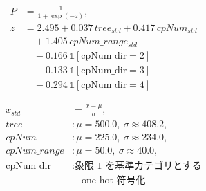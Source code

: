 \begin{equation}
\label{eq:logistic_multi_scaled_prospect}
\begin{aligned}
  P &= \frac{1}{1 + \exp(-z)}, \\
  z &= 2.495 + 0.037\, tree_{std} + 0.417\, cpNum_{std} \\
    &\quad + 1.405\, cpNum\_range_{std} \\
    &\quad - 0.166\, \mathbb{1}[\mathrm{cpNum\_dir}{=}2] \\
    &\quad - 0.133\, \mathbb{1}[\mathrm{cpNum\_dir}{=}3] \\
    &\quad - 0.294\, \mathbb{1}[\mathrm{cpNum\_dir}{=}4]
\end{aligned}
\end{equation}

\begin{equation}
\label{eq:standardization_task1}
\begin{aligned}
  x_{std} &= \frac{x - \mu}{\sigma}, \\
  tree &: \mu=500.0,\ \sigma \approx 408.2, \\
  cpNum &: \mu=225.0,\ \sigma \approx 234.0, \\
  cpNum\_range &: \mu=50.0,\ \sigma \approx 40.0, \\
  \mathrm{cpNum\_dir} &: \text{象限 1 を基準カテゴリとする} \\
    &\quad \text{one-hot 符号化}
\end{aligned}
\end{equation}
